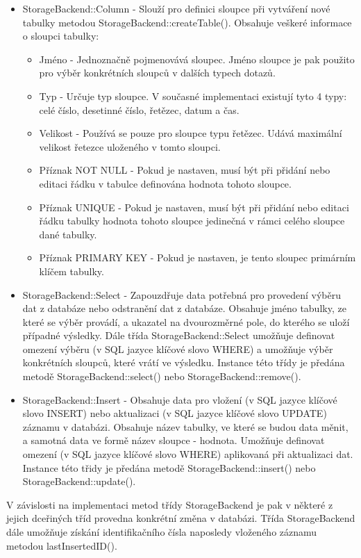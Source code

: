 \begin{itemize}
\item StorageBackend::Column - Slouží pro definici sloupce při vytváření nové tabulky metodou StorageBackend::createTable().
Obsahuje veškeré informace o sloupci tabulky:
\begin{itemize}
\item Jméno - Jednoznačně pojmenovává sloupec. Jméno sloupce je pak použito pro výběr konkrétních sloupců v dalších typech
dotazů.
\item Typ - Určuje typ sloupce. V současné implementaci existují tyto 4 typy: celé číslo, desetinné číslo, řetězec, datum a čas.
\item Velikost - Používá se pouze pro sloupce typu řetězec. Udává maximální velikost řetezce uloženého v tomto sloupci.
\item Příznak NOT NULL - Pokud je nastaven, musí být při přidání nebo editaci řádku v tabulce definována hodnota tohoto sloupce.
\item Příznak UNIQUE - Pokud je nastaven, musí být při přidání nebo editaci řádku tabulky hodnota tohoto sloupce jedinečná v rámci
celého sloupce dané tabulky.
\item Příznak PRIMARY KEY - Pokud je nastaven, je tento sloupec primárním klíčem tabulky.
\end{itemize}
\item StorageBackend::Select - Zapouzdřuje data potřebná pro provedení výběru dat z databáze nebo odstranění dat z databáze.
Obsahuje jméno tabulky,
ze které se výběr provádí, a ukazatel na dvourozměrné pole, do kterého se uloží případné
výsledky. Dále třída StorageBackend::Select umožňuje
definovat omezení výběru (v SQL jazyce klíčové slovo WHERE) a umožňuje výběr konkrétních sloupců, které vrátí ve výsledku.
Instance této třídy je předána metodě StorageBackend::select() nebo StorageBackend::remove().
\item StorageBackend::Insert - Obsahuje data pro vložení (v SQL jazyce klíčové
slovo INSERT) nebo aktualizaci (v SQL jazyce klíčové slovo UPDATE)
záznamu v databázi. Obsahuje název tabulky, ve které se budou data měnit, a samotná data ve formě název sloupce - hodnota.
Umožňuje definovat omezení (v SQL jazyce klíčové slovo WHERE) aplikovaná při aktualizaci dat. Instance této třidy je předána metodě
StorageBackend::insert() nebo StorageBackend::update().
\end{itemize}

V závislosti na implementaci metod třídy StorageBackend je pak v některé z
jejich dceřiných tříd provedna konkrétní změna v
databázi. Třída StorageBackend dále umožňuje získání identifikačního čísla naposledy vloženého záznamu metodou lastInsertedID().


